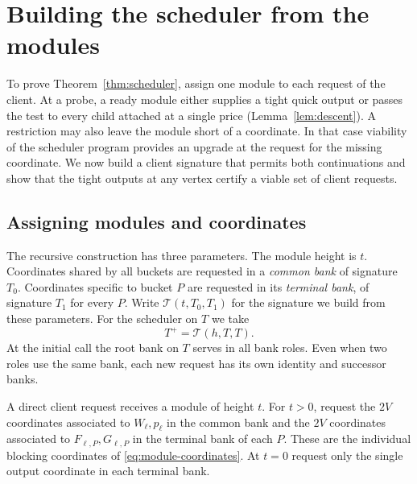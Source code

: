 \section{Building the scheduler from the modules}\label{sec:compiler}

To prove Theorem~\ref{thm:scheduler}, assign one module to each request of the client.
At a probe, a ready module either supplies a tight quick output or passes the test to
every child attached at a single price (Lemma~\ref{lem:descent}). A restriction may
also leave the module short of a coordinate. In that case viability of the scheduler
program provides an upgrade at the request for the missing coordinate. We now build a
client signature that permits both continuations and show that the tight outputs at
any vertex certify a viable set of client requests.

\subsection{Assigning modules and coordinates}

The recursive construction has three parameters. The module height is \(t\).
Coordinates shared by all buckets are requested in a \emph{common bank} of signature
\(T_0\). Coordinates specific to bucket \(P\) are requested in its \emph{terminal
bank}, of signature \(T_1\) for every \(P\). Write \(\mathcal T(t,T_0,T_1)\) for
the signature we build from these parameters. For the scheduler on \(T\) we take
\[
                     T^+=\mathcal T(h,T,T).
\]
At the initial call the root bank on \(T\) serves in all bank roles. Even when two
roles use the same bank, each new request has its own identity and successor banks.

A direct client request receives a module of height \(t\). For \(t>0\), request the
\(2V\) coordinates associated to \(W_\ell,p_\ell\) in the common bank and the
\(2V\) coordinates associated to \(F_{\ell,P},G_{\ell,P}\) in the terminal bank of
each \(P\). These are the individual blocking coordinates of
\eqref{eq:module-coordinates}. At \(t=0\) request only the single output coordinate
in each terminal bank.


